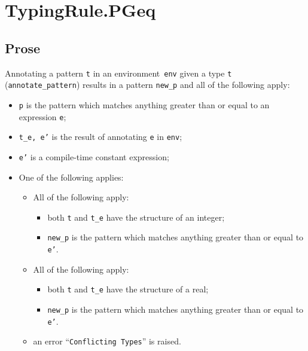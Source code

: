 \documentclass{book}
\begin{document}

\section{TypingRule.PGeq \label{sec:TypingRule.PGeq}}

  \subsection{Prose}
   Annotating a pattern \texttt{t} in an environment~\texttt{env} given a type \texttt{t} (\texttt{annotate\_pattern}) results in a pattern \texttt{new\_p} and all of the following apply:
   \begin{itemize}
   \item \texttt{p} is the pattern which matches anything greater than or equal to an expression \texttt{e};
   \item \texttt{t\_e, e'} is the result of annotating \texttt{e} in \texttt{env};
   \item \texttt{e'} is a compile-time constant expression;
   \item One of the following applies:
     \begin{itemize}
     \item All of the following apply:
           \begin{itemize}
           \item both \texttt{t} and \texttt{t\_e} have the structure of an integer;
           \item \texttt{new\_p} is the pattern which matches anything greater than or equal to \texttt{e'}.
           \end{itemize}
     \item All of the following apply:
           \begin{itemize}
           \item both \texttt{t} and \texttt{t\_e} have the structure of a real;
           \item \texttt{new\_p} is the pattern which matches anything greater than or equal to \texttt{e'}.
           \end{itemize}
     \item an error ``\texttt{Conflicting Types}'' is raised.
     \end{itemize}
   \end{itemize}
\end{document}
